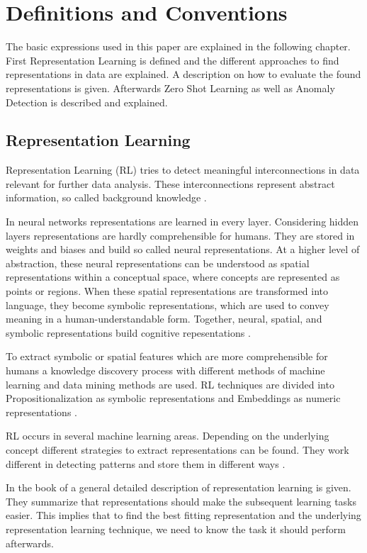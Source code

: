 \section{Definitions and Conventions}\label{theory}
The basic expressions used in this paper are explained in the following chapter. First Representation Learning is defined and the different approaches to find representations in data are explained. A description on how to evaluate the found representations is given. Afterwards Zero Shot Learning as well as Anomaly Detection is described and explained.
\subsection{Representation Learning}
Representation Learning (RL) tries to detect meaningful interconnections in data relevant for further data analysis. These interconnections represent abstract information, so called background knowledge .

In neural networks representations are learned in every layer. Considering hidden layers representations are hardly comprehensible for humans. They are stored in weights and biases and build so called neural representations. At a higher level of abstraction, these neural representations can be understood as spatial representations within a conceptual space, where concepts are represented as points or regions.   When these spatial representations are transformed into language, they become symbolic representations, which are used to convey meaning in a human-understandable form. Together, neural, spatial, and symbolic representations build cognitive repesentations .

To extract symbolic or spatial features which are more comprehensible for humans a knowledge discovery process with different methods of machine learning and data mining methods are used. RL techniques are divided into Propositionalization as symbolic representations and Embeddings as numeric representations .

RL occurs in several machine learning areas. Depending on the underlying concept different strategies to extract representations can be found. They work different in detecting patterns and store them in different ways .

In the book of  a general detailed description of representation learning is given. They summarize that representations should make the subsequent learning tasks easier. This implies that to find the best fitting representation and the underlying representation learning technique, we need to know the task it should perform afterwards.

